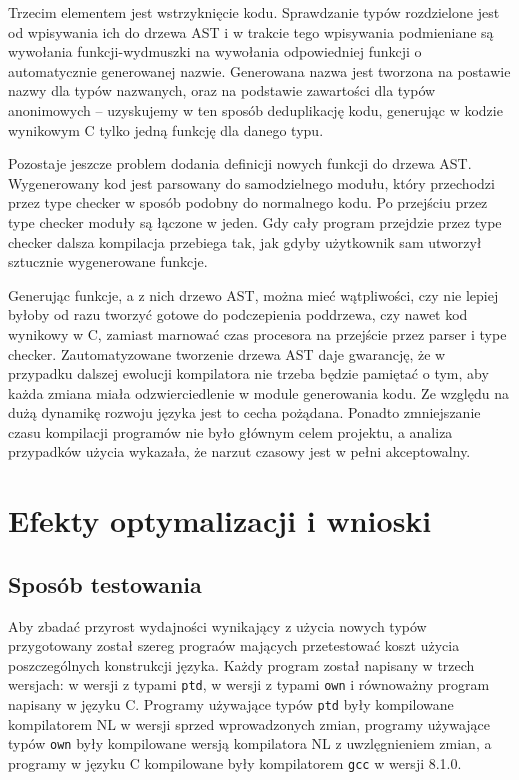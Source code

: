 \documentclass[licencjacka]{pracamgr}
\begin{document}
Trzecim elementem jest wstrzyknięcie kodu. Sprawdzanie typów rozdzielone jest od wpisywania ich do drzewa AST
i w trakcie tego wpisywania podmieniane są wywołania funkcji-wydmuszki na wywołania
odpowiedniej funkcji o automatycznie generowanej nazwie. Generowana nazwa jest tworzona na postawie nazwy dla typów nazwanych, oraz na podstawie zawartości
dla typów anonimowych -- uzyskujemy w ten sposób deduplikację kodu, generując w kodzie wynikowym C tylko jedną funkcję dla danego typu.

Pozostaje jeszcze problem dodania definicji nowych funkcji do drzewa AST. Wygenerowany kod jest parsowany do samodzielnego modułu,
który przechodzi przez type checker w sposób podobny do normalnego kodu. Po przejściu przez type checker moduły są łączone w jeden. Gdy cały program przejdzie przez type checker
dalsza kompilacja przebiega tak, jak gdyby użytkownik sam utworzył sztucznie wygenerowane funkcje.

Generując funkcje, a z nich drzewo AST, można mieć wątpliwości, czy nie lepiej byłoby od razu tworzyć gotowe do podczepienia poddrzewa, czy nawet kod wynikowy w C,
zamiast marnować czas procesora na przejście przez parser i type checker. 
Zautomatyzowane tworzenie drzewa AST daje gwarancję, że w przypadku dalszej ewolucji kompilatora nie trzeba będzie pamiętać o tym,
aby każda zmiana miała odzwierciedlenie w module generowania kodu. Ze względu na dużą dynamikę rozwoju języka jest to cecha pożądana.
Ponadto zmniejszanie czasu kompilacji programów nie było głównym celem projektu, a analiza przypadków użycia wykazała, że narzut czasowy jest w pełni akceptowalny.

\chapter{Efekty optymalizacji i wnioski}
\section{Sposób testowania}
Aby zbadać przyrost wydajności wynikający z użycia nowych typów przygotowany został szereg prograów mających
przetestować koszt użycia poszczególnych konstrukcji języka.
Każdy program został napisany w trzech wersjach: w wersji z typami \texttt{ptd}, w wersji z typami \texttt{own}
i równoważny program napisany w języku C.
Programy używające typów \texttt{ptd} były kompilowane kompilatorem NL w wersji sprzed wprowadzonych zmian,
programy używające typów \texttt{own} były kompilowane wersją kompilatora NL z uwzlęgnieniem zmian, a programy w języku C
kompilowane były kompilatorem \texttt{gcc} w wersji 8.1.0.
\end{document}
